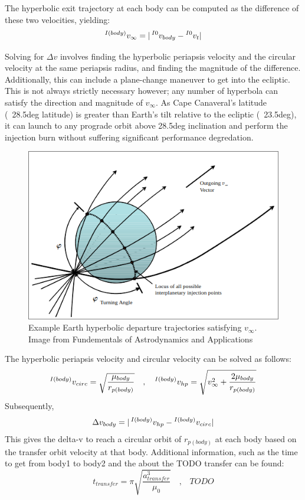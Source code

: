 \documentclass[conference]{IEEEtran}
\begin{document}
	The hyperbolic exit trajectory at each body can be computed as the difference of these two velocities, yielding:
	\[
	\prescript{I(body)}{}{v_{\infty}} = |\prescript{I0}{}{v_{body}} - \prescript{I0}{}{v_{t}}|
	\]
	
	Solving for $\Delta v$ involves finding the hyperbolic periapsis velocity and the circular velocity at the same periapsis radius, and finding the magnitude of the difference. Additionally, this can include a plane-change maneuver to get into the ecliptic. This is not always strictly necessary however; any number of hyperbola can satisfy the direction and magnitude of $v_{\infty}$. As Cape Canaveral's latitude (~28.5deg latitude) is greater than Earth's tilt relative to the ecliptic (~23.5deg), it can launch to any prograde orbit above 28.5deg inclination and perform the injection burn without suffering significant performance degredation.
	
	\begin{figure}[H]
		\centerline{\includegraphics[width=\linewidth]{fig1.png}}
		\caption{Example Earth hyperbolic departure trajectories satisfying $v_{\infty}$. Image from Fundementals of Astrodynamics and Applications \cite{b4}}
		\label{fig}
	\end{figure}
	
	The hyperbolic periapsis velocity and circular velocity can be solved as follows:
	\[
	\prescript{I(body)}{}{v_{circ}} = \sqrt{\frac{\mu_{body}}{r_{p(body)}}}
	\quad\text{,}\quad
	\prescript{I(body)}{}{v_{hp}} = \sqrt{v_{\infty}^2 + \frac{2\mu_{body}}{r_{p(body)}}}
	\]
	Subsequently,
	\[
	\Delta v_{body} = |\prescript{I(body)}{}{v_{hp}} - \prescript{I(body)}{}{v_{circ}}|
	\]
	This gives the delta-v to reach a circular orbit of $r_{p(body)}$ at each body based on the transfer orbit velocity at that body. Additional information, such as the time to get from body1 to body2 and the about the TODO transfer can be found:
	\[
	t_{transfer} = \pi \sqrt{\frac{a_{transfer}^3}{\mu_0}}
	\quad\text{,}\quad
	TODO
	\]
	
\end{document}
